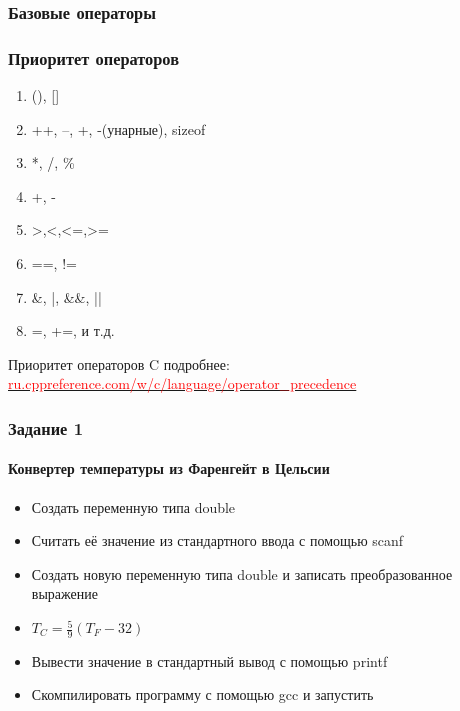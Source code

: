 \documentclass[14pt,pdf,hyperref={unicode}]{beamer}
\begin{document}
\begin{frame}
\frametitle{Базовые операторы}
\frametitle{Приоритет операторов}
\begin{center}
\begin{enumerate}
\item (), []
\item ++, --, +, -(унарные), sizeof
\item *, /, \%
\item +, -
\item >,<,<=,>=
\item ==, !=
\item \&, |, \&\&, ||
\item =, +=, и т.д.
\end{enumerate}
\end{center}
Приоритет операторов C подробнее:\\
\href{http://ru.cppreference.com/w/c/language/operator_precedence}
{\textcolor{red}{ru.cppreference.com/w/c/language/operator\_precedence}}
\end{frame}

\begin{frame}
\frametitle{Задание 1} 
\framesubtitle{Конвертер температуры из Фаренгейт в Цельсии} 
\begin{center}
\begin{itemize}
\item Создать переменную типа double \\
\item Считать её значение из стандартного ввода с помощью scanf\\
\item Создать новую переменную типа double и записать преобразованное выражение \\
\item $T_C = \frac{5}{9}(T_F-32)$\\
\item Вывести значение в стандартный вывод с помощью printf\\
\item Скомпилировать программу с помощью gcc и запустить
\end{itemize}
\end{center}
\end{frame}
\end{document}

